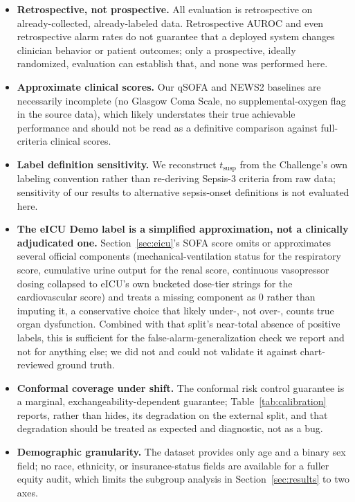 \documentclass[11pt]{article}
\begin{document}
\begin{itemize}[leftmargin=*]
approximated Sepsis-3 label -- remains the single highest-priority follow-up.
    \item \textbf{Retrospective, not prospective.} All evaluation is retrospective on already-collected, already-labeled data. Retrospective AUROC and even retrospective alarm rates do not guarantee that a deployed system changes clinician behavior or patient outcomes; only a prospective, ideally randomized, evaluation can establish that, and none was performed here.
    \item \textbf{Approximate clinical scores.} Our qSOFA and NEWS2 baselines are necessarily incomplete (no Glasgow Coma Scale, no supplemental-oxygen flag in the source data), which likely understates their true achievable performance and should not be read as a definitive comparison against full-criteria clinical scores.
    \item \textbf{Label definition sensitivity.} We reconstruct $t_{\text{susp}}$ from the Challenge's own labeling convention rather than re-deriving Sepsis-3 criteria from raw data; sensitivity of our results to alternative sepsis-onset definitions is not evaluated here.
    \item \textbf{The eICU Demo label is a simplified approximation, not a clinically adjudicated one.} Section~\ref{sec:eicu}'s SOFA score omits or approximates several official components (mechanical-ventilation status for the respiratory score, cumulative urine output for the renal score, continuous vasopressor dosing collapsed to eICU's own bucketed dose-tier strings for the cardiovascular score) and treats a missing component as 0 rather than imputing it, a conservative choice that likely under-, not over-, counts true organ dysfunction. Combined with that split's near-total absence of positive labels, this is sufficient for the false-alarm-generalization check we report and not for anything else; we did not and could not validate it against chart-reviewed ground truth.
    \item \textbf{Conformal coverage under shift.} The conformal risk control guarantee is a marginal, exchangeability-dependent guarantee; Table~\ref{tab:calibration} reports, rather than hides, its degradation on the external split, and that degradation should be treated as expected and diagnostic, not as a bug.
    \item \textbf{Demographic granularity.} The dataset provides only age and a binary sex field; no race, ethnicity, or insurance-status fields are available for a fuller equity audit, which limits the subgroup analysis in Section~\ref{sec:results} to two axes.
\end{itemize}
\end{document}
